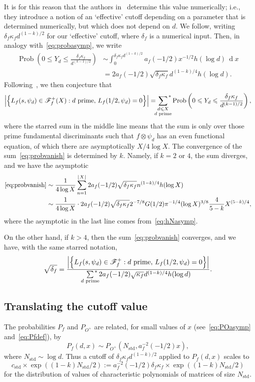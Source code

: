 \documentclass[11pt,reqno]{amsart} \usepackage{fullpage}
\renewcommand{\leq}{\leqslant}
\newcommand{\F}{\ensuremath{\mathbf{F}}}
\renewcommand{\d}[1]{\,\operatorname*{d}\!{#1}}
\newcommand\be{\begin{equation}}
\newcommand\ee{\end{equation}}
\newcommand{\nstd}{N_{\text{std}}}
\newcommand{\cstd}{c_{\text{std}}}
\DeclareMathOperator{\Prob}{Prob}
\renewcommand{\F}{\mathcal F_f}
\numberwithin{equation}{section}
\begin{document}
It is for this reason that the authors in~\cite{DHKMS} determine this value numerically;
i.e., they introduce a notion of an `effective' cutoff depending on a parameter that is
determined numerically, but which does not depend on $d$. We follow, writing
$\delta_f\kappa_f d^{(1-k)/2}$ for our `effective' cutoff, where $\delta_f$ is a numerical
input. Then, in analogy with~\eqref{eq:probasymp}, we write
\be\begin{aligned}\Prob\left(0\leq Y_d\leq\frac{\delta_f\kappa_f}{d^{(k-1)/2}}\right)
  &\sim\int_0^{\delta_f\kappa_fd^{(1-k)/2}}a_f(-1/2)x^{-1/2}h(\log d)\d x \\
  &=2a_f(-1/2)\sqrt{\delta_f\kappa_f} d^{(1-k)/4}h(\log d).\end{aligned}\ee
Following~\cite{CKRS1}, we then conjecture that
\be\label{eq:probvanish}
\left|\left\{L_f(s,\psi_d)\in\F^+(X):d\text{ prime, }L_f(1/2,\psi_d)=0\right\}\right|=\left.\sum_{\mathclap{\substack{d\leq X\\d\text{ prime}}}}\right.^\ast
\Prob\left(0\leq Y_d\leq\frac{\delta_f\kappa_f}{d^{(k-1)/2}}\right),
\ee where the starred sum in the middle line means that the sum is only over those prime
fundamental discriminants such that $f\otimes\psi_d$ has an even functional equation, of
which there are asymptotically $X/4\log X$.
The convergence of the sum~\eqref{eq:probvanish} is determined by $k$. Namely, if $k=2$ or
$4$, the sum diverges, and we have the asymptotic
\be\begin{aligned}
  \eqref{eq:probvanish}
  &\sim\frac1{4\log X}\sum_{n=1}^{\lfloor X\rfloor}2a_f(-1/2)\sqrt{\delta_f\kappa_f}
  n^{(1-k)/4}h(\log X) \\
  &\sim\frac1{4\log X}\cdot2a_f(-1/2)\sqrt{\delta_f\kappa_f}2^{-7/8}G(1/2)\pi^{-1/4}
  (\log X)^{3/8}\frac4{5-k}X^{(5-k)/4},\end{aligned}\ee
where the asymptotic in the last line comes from~\eqref{eq:hNasymp}.

On the other hand, if $k>4$, then the sum~\eqref{eq:probvanish} converges, and we have,
with the same starred notation,
\be \sqrt{\delta_f}=
\frac{\left|\left\{L_f(s,\psi_d)\in\F^+:d\text{ prime, }
      L_f(1/2,\psi_d)=0\right\}\right|}
{\left.\sum\limits_{\mathclap{\substack{d\text{ prime}}}}\right.^\ast
  2a_f(-1/2)\sqrt{\kappa_f}d^{(1-k)/4}h(\log d)}.\ee

\subsection{Translating the cutoff value}
The probabilities $P_f$ and $P_{O^+}$ are related, for small values of $x$
(see~\eqref{eq:POasymp} and~\eqref{eq:Pfdef}), by
\be P_f(d,x)\sim P_{O^+}\left(\nstd,a^{-2}_f(-1/2)x\right),\ee where $\nstd\sim\log d$.
Thus a cutoff of $\delta_f\kappa_fd^{(1-k)/2}$ applied to $P_f(d,x)$ scales to
\be\cstd\times\exp\left((1-k)\nstd/2\right)
:=a_f^{-2}(-1/2)\delta_f\kappa_f\times\exp\left((1-k)\nstd/2\right)\ee for the distribution
of values of characteristic polynomials of matrices of size $\nstd$.
\end{document}
